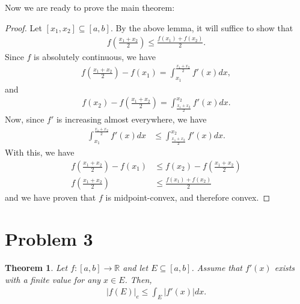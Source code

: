 \documentclass[10pt,a4paper]{article}
\theoremstyle{theorem}
\newtheorem{theorem}{Theorem}
\theoremstyle{definition}
\begin{document}
Now we are ready to prove the main theorem:
\begin{proof}
Let $[x_1, x_2] \subseteq [a, b]$. By the above lemma, it will suffice to show that 
\begin{align*}
f \left(\frac{x_1 + x_2}{2} \right) \leq \frac{f(x_1) + f(x_2)}{2}.
\end{align*} 
Since $f$ is absolutely continuous, we have
\begin{align*}
f \left(\frac{x_1 + x_2}{2} \right) - f(x_1) = \int_{x_1}^{\frac{x_1 + x_2}{2}} f'(x)dx,
\end{align*}
and 
\begin{align*}
f(x_2) - f \left(\frac{x_1 + x_2}{2} \right) = \int_{\frac{x_1 + x_2}{2}}^{x_2} f'(x)dx.
\end{align*}
Now, since $f'$ is increasing almost everywhere, we have
\begin{align*}
\int_{x_1}^{\frac{x_1 + x_2}{2}} f'(x)dx &\leq \int_{\frac{x_1 + x_2}{2}}^{x_2} f'(x)dx.
\end{align*}
With this, we have
\begin{align*}
f \left(\frac{x_1 + x_2}{2} \right) - f(x_1) &\leq f(x_2) - f \left(\frac{x_1 + x_2}{2} \right)\\
f \left(\frac{x_1 + x_2}{2} \right) &\leq \frac{f(x_1) + f(x_2)}{2}
\end{align*}
and we have proven that $f$ is midpoint-convex, and therefore convex.
\end{proof}

\section*{Problem 3}
\begin{theorem}
Let $f:[a, b] \to \mathbb{R}$ and let $E \subseteq [a, b]$. Assume that $f'(x)$ exists with a finite value for any $x \in E$. Then,
\begin{align*}
|f(E)|_e \leq \int_E |f'(x)|dx.
\end{align*}
\end{theorem}
\end{document}
